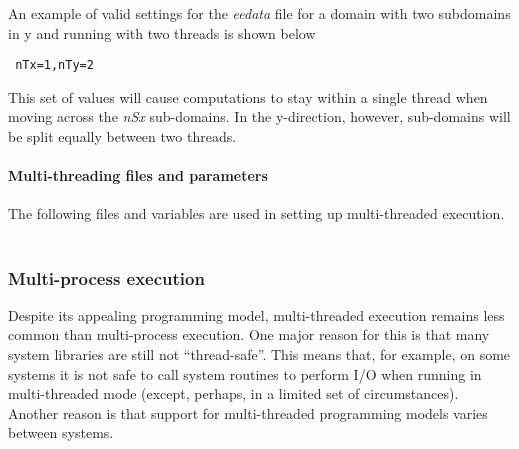 An example of valid settings for the {\em eedata} file for a
domain with two subdomains in y and running with two threads is shown 
below
\begin{verbatim}
 nTx=1,nTy=2
\end{verbatim}
This set of values will cause computations to stay within a single
thread when moving across the {\em nSx} sub-domains. In the y-direction,
however, sub-domains will be split equally between two threads.

\paragraph{Multi-threading files and parameters} The following
files and variables are used in setting up multi-threaded execution.\\

 \\

\subsubsection{Multi-process execution}
\label{sect:multi-process-execution}

Despite its appealing programming model, multi-threaded execution
remains less common than multi-process execution. One major reason for
this is that many system libraries are still not ``thread-safe''. This
means that, for example, on some systems it is not safe to call system
routines to perform I/O when running in multi-threaded mode (except,
perhaps, in a limited set of circumstances).  Another reason is that
support for multi-threaded programming models varies between systems.


